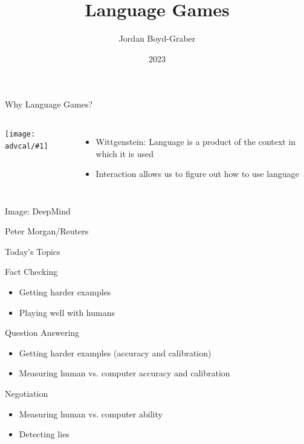 \documentclass[compress]{beamer}
\title[]{Language Games}
\author{ Jordan Boyd-Graber}
\date{2023}
\institute[] %
{University of Maryland}
\newcommand{\fsi}[2]{
\begin{frame}[plain]
\vspace*{-1pt}
\makebox[\linewidth]{\texttt{[image: \#1]}}
\begin{center}
#2
\end{center}
\end{frame}
}
\newcommand{\gfxa}[2]{
	\begin{center}
		\texttt{[image: advcal/\#1]}
	\end{center}
}
\begin{document}
\frame{
\titlepage
\tiny
}


\begin{frame}{Why Language Games?}


  \begin{columns}


    \gfxa{wittgenstein}{.8}




    \begin{itemize}

      \item Wittgenstein: Language is a product of the context in which it is
        used
      \item Interaction allows us to figure out how to use language
    \end{itemize}


    \end{columns}

  

\end{frame}

\fsi{qb/starcraft}{Image: DeepMind}
\fsi{qb/DeepBlue}{Peter Morgan/Reuters}

\begin{frame}{Today's Topics}
	\item Fact Checking
	\begin{itemize}
		\item Getting harder examples
		\item Playing well with humans
	\end{itemize}
	\item Question Answering
	\begin{itemize}
		\item Getting harder examples (accuracy and calibration)
		\item Measuring human vs. computer accuracy and calibration
	\end{itemize}
	\item Negotiation
	\begin{itemize}
		\item Measuring human vs. computer ability
		\item Detecting lies
	\end{itemize}
\end{frame}
\end{document}
